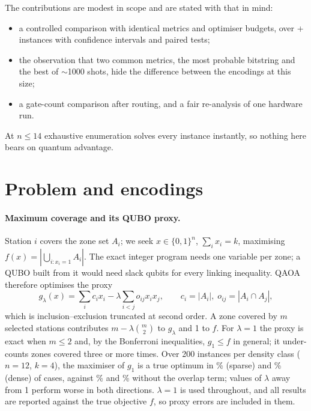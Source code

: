\documentclass[11pt,a4paper]{article}
\begin{document}
The contributions are modest in scope and are stated with that in mind:
\begin{itemize}\setlength\itemsep{0pt}
\item a controlled comparison with identical metrics and optimiser budgets, over \NR{}+\NH{}
instances with confidence intervals and paired tests;
\item the observation that two common metrics, the most probable bitstring and the best of
$\sim$1000 shots, hide the difference between the encodings at this size;
\item a gate-count comparison after routing, and a fair re-analysis of one hardware run.
\end{itemize}
At $n\le 14$ exhaustive enumeration solves every instance instantly, so nothing here bears on
quantum advantage.

\section{Problem and encodings}
\paragraph{Maximum coverage and its QUBO proxy.} Station $i$ covers the zone set $A_i$; we seek
$x\in\{0,1\}^n$, $\sum_i x_i=k$, maximising $f(x)=|\bigcup_{i:x_i=1}A_i|$. The exact integer program
needs one variable per zone; a QUBO built from it would need slack qubits for every linking
inequality. QAOA therefore optimises the proxy
\begin{equation}
g_\lambda(x)=\sum_i c_i x_i-\lambda\sum_{i<j} o_{ij}x_ix_j,\qquad c_i=|A_i|,\; o_{ij}=|A_i\cap A_j|,
\end{equation}
which is inclusion--exclusion truncated at second order. A zone covered by $m$ selected stations
contributes $m-\lambda\binom{m}{2}$ to $g_\lambda$ and 1 to $f$. For $\lambda=1$ the proxy is exact when
$m\le2$ and, by the Bonferroni inequalities, $g_1\le f$ in general; it under-counts zones covered
three or more times. Over 200 instances per density class ($n=12$, $k=4$), the maximiser of $g_1$
is a true optimum in \LamSparse\% (sparse) and \LamDense\% (dense) of cases, against
\LamZeroSparse\% and \LamZeroDense\% without the overlap term; values of $\lambda$ away from 1
perform worse in both directions. $\lambda=1$ is used throughout, and all results are reported against
the true objective $f$, so proxy errors are included in them.
\end{document}
